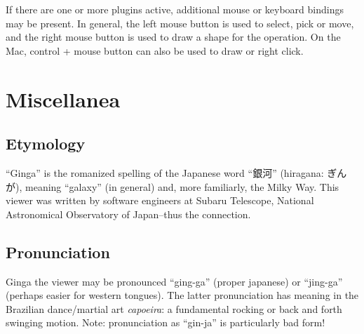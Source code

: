 \documentclass[11pt]{report}
\begin{document}

If there are one or more plugins active, additional mouse or keyboard
bindings may be present.  In general, the left mouse button is used to
select, pick or move, and the right mouse button is used to draw a
shape for the operation.  
On the Mac, control + mouse button can also be used to draw or right click.

\chapter{Miscellanea}
\section{Etymology}
``Ginga'' is the romanized spelling of the Japanese word ``銀河''
(hiragana: ぎんが), meaning ``galaxy'' (in general) and, more familiarly,
the Milky Way.  This viewer was written by software engineers at Subaru
Telescope, National Astronomical Observatory of Japan--thus the
connection. 

\section{Pronunciation}
Ginga the viewer may be pronounced ``ging-ga'' (proper japanese) or
``jing-ga'' (perhaps easier for western tongues).  The latter
pronunciation has meaning in the Brazilian dance/martial art
\emph{capoeira}: a fundamental rocking or back and forth swinging
motion.
Note: pronunciation as ``gin-ja'' is particularly bad form!
\end{document}
